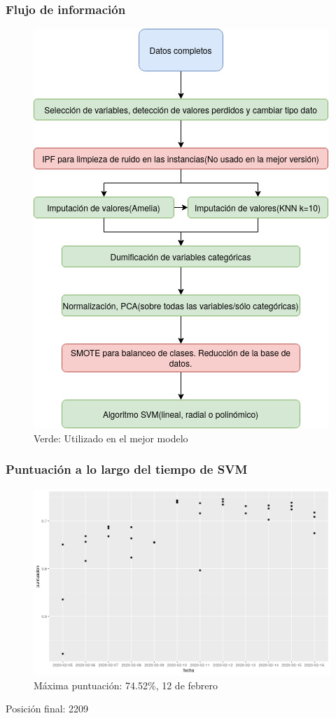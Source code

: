 \begin{frame}
\frametitle{Flujo de información}
\begin{figure}
	\centering
	\includegraphics[width=0.5\linewidth]{figures/DiagramaFlujoSVM}
	\caption{Verde: Utilizado en el mejor modelo}
	\label{fig:diagramaflujosvm}
\end{figure}


\end{frame}


\begin{frame}
\frametitle{Puntuación a lo largo del tiempo de SVM}

\begin{figure}
	\centering
	\includegraphics[width=\linewidth]{figures/puntuacionSVM}
	\caption{Máxima puntuación: 74.52\%,  12 de febrero}
	\label{fig:puntuacionsvm}
\end{figure}
Posición final: 2209


\end{frame}